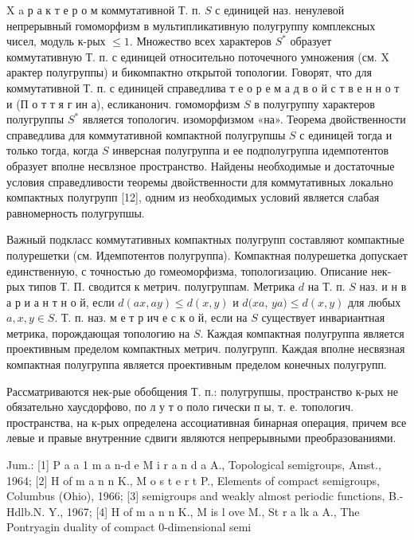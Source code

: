 \documentclass[10pt]{article}
\begin{document}
$\mathrm{X}$ a р а к т е р о м коммутативной Т. п. $S$ с единицей наз. ненулевой непрерывный гомоморфизм в мультипликативную полугруппу комплексных чисел, модуль к-рых $\leqslant 1$. Множество всех характеров $S^{*}$ образует коммутативную Т. п. с единицей относительно поточечного умножения (см. X арактер полугруппы) и бикомпактно открытой топологии. Говорят, что для коммутативной Т. п. с единицей справедлива т е о р е м а д в о й с т в е н н о т и (П о т т я г ин а), есликанонич. гомоморфизм $S$ в полугруппу характеров полугруппы $S^{*}$ является топологич. изоморфизмом «на». Теорема двойственности справедлива для коммутативной компактной полугрупшы $S$ с единицей тогда и только тогда, когда $S$ инверсная полугруппа и ее подполугруппа идемпотентов образует вполне несвлзное пространство. Найдены необходимые и достаточные условия справедливости теоремы двойственности для коммутативных локально компактных полугрупп [12], одним из необходимых условий является слабая равномерность полугрупшы.



Важный подкласс коммутативных компактных полугрупп составляют компактные полурешетки (см. Идемпотентов полугруппа). Компактная полурешетка допускает единственную, с точностью до гомеоморфизма, топологизацию. Описание нек-рых типов Т. П. сводится к метрич. полугруппам. Метрика $d$ на Т. п. $S$ наз. и н в а р и а н т н о й, если $d(a x, a y) \leqslant d(x, y)$ и $d(x a$, $y a) \leqslant d(x, y)$ для любых $a, x, y \in S$. Т. п. наз. м е т р ич е с к о й, если на $S$ существует инвариантная метрика, порождающая топологию на $S$. Каждая компактная полугруппа является проективным пределом компактных метрич. полугрупп. Каждая вполне несвязная компактная полугруппа является проективным пределом конечных полугрупп.



Рассматриваются нек-рые обобщения Т. п.: полугрупшы, пространство к-рых не обязательно хаусдорфово, по л у т о поло гически п ы, т. е. топологич. пространства, на к-рых определена ассоциативная бинарная операция, причем все левые и правые внутренние сдвиги являются непрерывными преобразованиями.



Jum.: [1] P a a 1 m a n-d e M i r a n d a A., Topological semigroups, Amst., 1964; [2] H of m a n $\mathrm{n}$ K., M o s t e r t P., Elements of compact semigroups, Columbus (Ohio), 1966; [3] semigroups and weakly almost periodic functions, B.- Hdlb.N. Y., 1967; [4] H of m a n n K., M is l ove M., St r a l$\mathrm{k}$ a A., The Pontryagin duality of compact 0-dimensional semi
\end{document}
